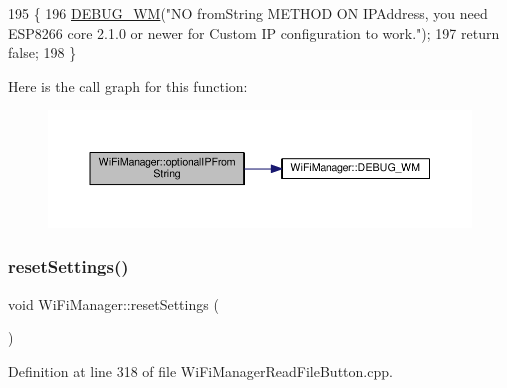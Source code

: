 \begin{DoxyCode}
195                                            \{
196       \hyperlink{class_wi_fi_manager_ae5f595c670ccbcf9a191baf50f5c7c26}{DEBUG\_WM}(\textcolor{stringliteral}{"NO fromString METHOD ON IPAddress, you need ESP8266 core 2.1.0 or newer for Custom
       IP configuration to work."});
197       \textcolor{keywordflow}{return} \textcolor{keyword}{false};
198     \}
\end{DoxyCode}
Here is the call graph for this function\+:\nopagebreak
\begin{figure}[H]
\begin{center}
\leavevmode
\includegraphics[width=350pt]{d4/dc8/class_wi_fi_manager_aa248b818eee0423b14a88c637f7c4637_cgraph}
\end{center}
\end{figure}
\mbox{\label{class_wi_fi_manager_a0027749816b6c66bc845d7c5db760a33}} 
\subsubsection{\texorpdfstring{reset\+Settings()}{resetSettings()}}
{\footnotesize\ttfamily void Wi\+Fi\+Manager\+::reset\+Settings (\begin{DoxyParamCaption}{ }\end{DoxyParamCaption})}



Definition at line 318 of file Wi\+Fi\+Manager\+Read\+File\+Button.\+cpp.


